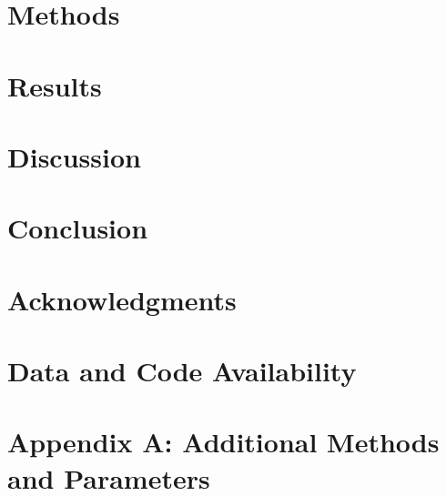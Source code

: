 \documentclass[11pt]{article}
\begin{document}
\section*{Methods}

\section*{Results}

\section*{Discussion}


\section*{Conclusion}

\section*{Acknowledgments}


\section*{Data and Code Availability}

\section*{Appendix A: Additional Methods and Parameters}

%
%
%
%
\end{document}
